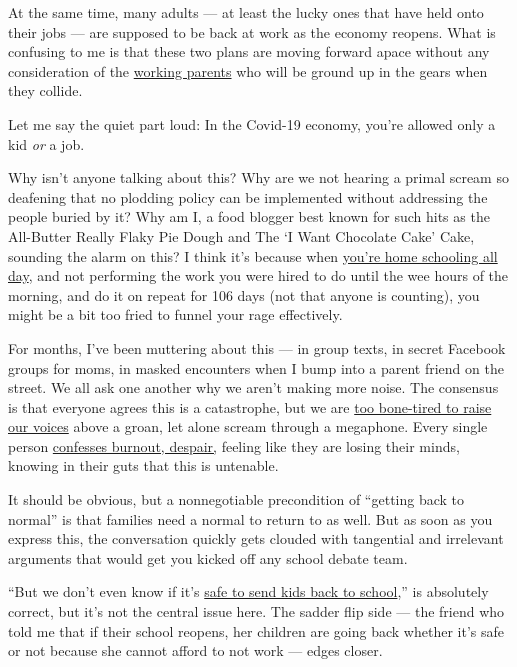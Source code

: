 At the same time, many adults --- at least the lucky ones that have held
onto their jobs --- are supposed to be back at work as the economy
reopens. What is confusing to me is that these two plans are moving
forward apace without any consideration of the
\href{https://www.nytimes3xbfgragh.onion/2020/07/08/us/drisana-rios-lawsuit-hub-international.html}{working
parents} who will be ground up in the gears when they collide.

Let me say the quiet part loud: In the Covid-19 economy, you're allowed
only a kid \emph{or} a job.

Why isn't anyone talking about this? Why are we not hearing a primal
scream so deafening that no plodding policy can be implemented without
addressing the people buried by it? Why am I, a food blogger best known
for such hits as the All-Butter Really Flaky Pie Dough and The `I Want
Chocolate Cake' Cake, sounding the alarm on this? I think it's because
when
\href{https://www.nytimes3xbfgragh.onion/2020/04/27/upshot/coronavirus-exposes-workplace-truths.html?action=click\&module=RelatedLinks\&pgtype=Article}{you're
home schooling all day}, and not performing the work you were hired to
do until the wee hours of the morning, and do it on repeat for 106 days
(not that anyone is counting), you might be a bit too fried to funnel
your rage effectively.

For months, I've been muttering about this --- in group texts, in secret
Facebook groups for moms, in masked encounters when I bump into a parent
friend on the street. We all ask one another why we aren't making more
noise. The consensus is that everyone agrees this is a catastrophe, but
we are
\href{https://www.nytimes3xbfgragh.onion/2020/04/27/nyregion/coronavirus-homeschooling-parents.html?action=click\&module=RelatedLinks\&pgtype=Article}{too
bone-tired to raise our voices} above a groan, let alone scream through
a megaphone. Every single person
\href{https://www.nytimes3xbfgragh.onion/2020/06/29/opinion/coronavirus-school-reopening.html}{confesses
burnout, despair,} feeling like they are losing their minds, knowing in
their guts that this is untenable.

It should be obvious, but a nonnegotiable precondition of ``getting back
to normal'' is that families need a normal to return to as well. But as
soon as you express this, the conversation quickly gets clouded with
tangential and irrelevant arguments that would get you kicked off any
school debate team.

``But we don't even know if it's
\href{https://www.nytimes3xbfgragh.onion/2020/06/12/upshot/epidemiologists-decisions-children-school-coronavirus.html}{safe
to send kids back to school},'' is absolutely correct, but it's not the
central issue here. The sadder flip side --- the friend who told me that
if their school reopens, her children are going back whether it's safe
or not because she cannot afford to not work --- edges closer.

